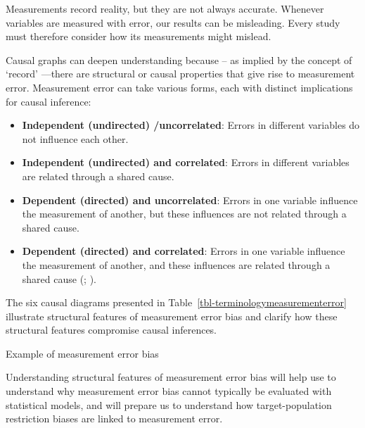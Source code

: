 \documentclass[
  single column]{article}
\providecommand{\tightlist}{%
  \setlength{\itemsep}{0pt}\setlength{\parskip}{0pt}}\usepackage{longtable,booktabs,array}
\begin{document}
Measurements record reality, but they are not always accurate. Whenever
variables are measured with error, our results can be misleading. Every
study must therefore consider how its measurements might mislead.

Causal graphs can deepen understanding because -- as implied by the
concept of `record' ---there are structural or causal properties that
give rise to measurement error. Measurement error can take various
forms, each with distinct implications for causal inference:

\begin{itemize}
\tightlist
\item
  \textbf{Independent (undirected) /uncorrelated}: Errors in different
  variables do not influence each other.
\item
  \textbf{Independent (undirected) and correlated}: Errors in different
  variables are related through a shared cause.
\item
  \textbf{Dependent (directed) and uncorrelated}: Errors in one variable
  influence the measurement of another, but these influences are not
  related through a shared cause.
\item
  \textbf{Dependent (directed) and correlated}: Errors in one variable
  influence the measurement of another, and these influences are related
  through a shared cause (; ).
\end{itemize}

The six causal diagrams presented in
Table~\ref{tbl-terminologymeasurementerror} illustrate structural
features of measurement error bias and clarify how these structural
features compromise causal inferences.

\begin{table}

\caption{\label{tbl-terminologymeasurementerror}Example of measurement
error bias}

\centering{

\terminologymeasurementerror

}

\end{table}%

Understanding structural features of measurement error bias will help
use to understand why measurement error bias cannot typically be
evaluated with statistical models, and will prepare us to understand how
target-population restriction biases are linked to measurement error.
\end{document}
